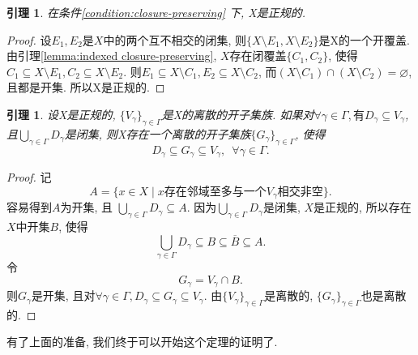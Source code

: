 \documentclass[a4paper,UTF8]{ctexart}
\newtheorem{lemma}[theorem]{引理}
\begin{document}
\begin{lemma} \label{lemma:regular}
  在条件\ref{condition:closure-preserving} 下, X是正规的.
\end{lemma}
\begin{proof}
  设$E_1, E_2$是$X$中的两个互不相交的闭集,
  则$\{ X \setminus E_1, X \setminus E_2 \}$是X的一个开覆盖.
  由引理\ref{lemma:indexed closure-preserving},
  $X$存在闭覆盖$\{ C_1, C_2 \}$,
  使得$C_1 \subseteq X \setminus E_1, C_2 \subseteq X \setminus E_2$.
  则$E_1 \subseteq X \setminus C_1, E_2 \subseteq X \setminus C_2$,
  而$(X \setminus C_1) \cap (X \setminus C_2) = \varnothing$,
  且都是开集. 所以X是正规的.
\end{proof}

\begin{lemma} \label{lemma:Dowker}
   设X是正规的, $\{ V_\gamma \}_{\gamma \in \Gamma}$是X的离散的开子集族.
  如果对$\forall \gamma \in \Gamma, \text{有}D_{\gamma} \subseteq V_{\gamma}$,
  且$\bigcup_{\gamma \in \Gamma} D_{\gamma}$是闭集,
  则X存在一个离散的开子集族$\{ G_{\gamma} \}_{\gamma \in \Gamma}$, 使得
  \[
    D_{\gamma} \subseteq G_{\gamma} \subseteq V_{\gamma}, \,\,\, \forall \gamma \in \Gamma.
  \]
\end{lemma}
\begin{proof}
  记
  \[
    A = \{ x \in X \mid x \text{存在邻域至多与一个} V_{\gamma} \text{相交非空} \}.
  \]
  容易得到$A$为开集, 且
  $\bigcup_{\gamma \in \Gamma} D_\gamma \subseteq A$.
  因为$\bigcup_{\gamma \in \Gamma} D_\gamma$是闭集, $X$是正规的,
  所以存在$X$中开集$B$, 使得
  \[
    \bigcup_{\gamma \in \Gamma} D_\gamma \subseteq B \subseteq \overline{B} \subseteq A.
  \]
  令
  \[
    G_\gamma = V_\gamma \cap B.
  \]
  则$G_\gamma$是开集, 且对$\forall \gamma \in \Gamma,
  D_\gamma \subseteq G_\gamma \subseteq V_\gamma$.
  由$\{ V_\gamma \}_{\gamma \in \Gamma}$是离散的, $\{ G_\gamma \}_{\gamma \in \Gamma}$也是离散的.
\end{proof}

有了上面的准备, 我们终于可以开始这个定理的证明了.
\end{document}
